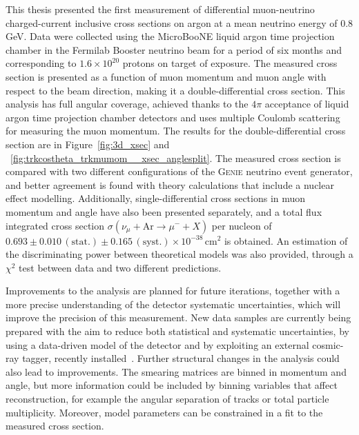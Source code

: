 This thesis presented the first measurement of differential muon-neutrino charged-current inclusive cross sections on argon at a mean neutrino energy of 0.8 GeV.
Data were collected using the MicroBooNE liquid argon time projection chamber in the Fermilab Booster neutrino beam for a period of six months and corresponding to $1.6 \times 10^{20}$ protons on target of exposure. The measured cross section is presented as a function of muon momentum and muon angle with respect to the beam direction, making it a double-differential cross section. This analysis has full angular coverage, achieved thanks to the $4\pi$ acceptance of liquid argon time projection chamber detectors and uses multiple Coulomb scattering for measuring the muon momentum. The results for the double-differential cross section are in Figure~\ref{fig:3d_xsec} and ~\ref{fig:trkcostheta_trkmumom__xsec_anglesplit}.
The measured cross section is compared with two different configurations of the \textsc{Genie} neutrino event generator, and better agreement is found with theory calculations that include a nuclear effect modelling. Additionally, single-differential cross sections in muon momentum and angle have also been presented separately, and a total flux integrated cross section $\sigma(\nu_\mu + \text{Ar} \rightarrow \mu^- + X)$ per nucleon of $0.693 \pm 0.010 \, (\text{stat.}) \pm 0.165 \, (\text{syst.}) \times 10^{-38} \, \text{cm}^{2}$ is obtained.
An estimation of the discriminating power between theoretical models was also provided, through a $\chi^2$ test between data and two different predictions.

Improvements to the analysis are planned for future iterations, together with a more precise understanding of the detector systematic uncertainties, which will improve the precision of this measurement. New data samples are currently being prepared with the aim to reduce both statistical and systematic uncertainties, by using a data-driven model of the detector and by exploiting an external cosmic-ray tagger, recently installed~\cite{crt}. 
Further structural changes in the analysis could also lead to improvements. The smearing matrices are binned in momentum and angle, but more information could be included by binning variables that affect reconstruction, for example the angular separation of tracks or total particle multiplicity. Moreover, model parameters can be constrained in a fit to the measured cross section.

